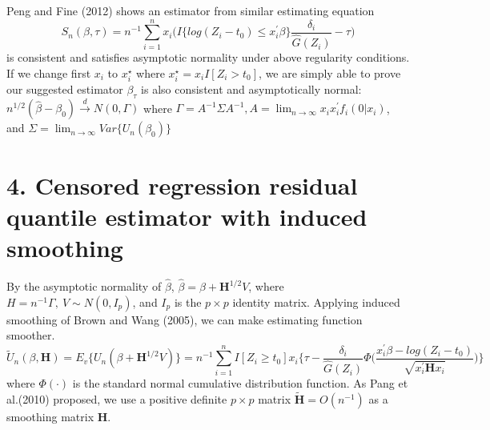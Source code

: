 \documentclass[12pt]{article}
\begin{document}
	Peng and Fine (2012) shows an estimator from similar estimating equation
	\begin{equation} \label{eq:6}
	S_n(\beta, \tau)=n^{-1}\sum_{i=1}^{n}x_i \Big( I\{log(Z_i-t_0) \leq x_i^{\prime} \beta\} \frac{\delta_i}{\hat{G}(Z_i)}  -\tau \Big)
	\end{equation}
	is consistent and satisfies asymptotic normality under above regularity conditions.
	If we change first $x_i$ to $x_i^\star$ where $x_i^\star = x_i I[Z_i>t_0]$, we are simply able to prove our suggested estimator $\beta_\tau$ is also consistent and asymptotically normal:
	\begin{math}
	n^{1/2}(\hat{\beta}-\beta_0) \xrightarrow{d} N(0, \Gamma)
	\end{math}
	where $\Gamma = A^{-1} \Sigma A^{-1}, A = \lim_{n \rightarrow \infty} x_i x_i^{\prime}f_i(0|x_i)$, and $\Sigma = \lim_{n \rightarrow \infty} Var\{U_n(\beta_0)\}$
\section{4. Censored regression residual quantile estimator with induced smoothing}
	By the asymptotic normality of $\hat{\beta}$, $\hat{\beta} = \beta+\textbf{H}^{1/2}V$, where $H = n^{-1}\Gamma,\ V \sim N(0, I_p)$, and $I_p$ is the $p \times p $ identity matrix. Applying induced smoothing of Brown and Wang (2005), we can make estimating function smoother.
	\begin{equation} \label{eq:7}
	\tilde{U}_n(\beta, \textbf{H}) = E_v \{U_n(\beta+\textbf{H}^{1/2}V)\} = n^{-1} \sum_{i=1}^{n} I[Z_i \geq t_0] x_i \Big\{\tau - \frac{\delta_i}{\hat{G}(Z_i)}\Phi\Big(\frac{x_i^\prime\beta-log(Z_i-t_0)}{\sqrt{x_i^{\prime} \textbf{H}x_{i}}}\Big)\Big\}
	\end{equation} 
	where $\Phi(\cdot)$ is the standard normal cumulative distribution function. As Pang et al.(2010) proposed, we use a positive definite $p \times p$ matrix $\tilde{\textbf{H}} = O(n^{-1})$ as a smoothing matrix $\textbf{H}$.
\end{document}
